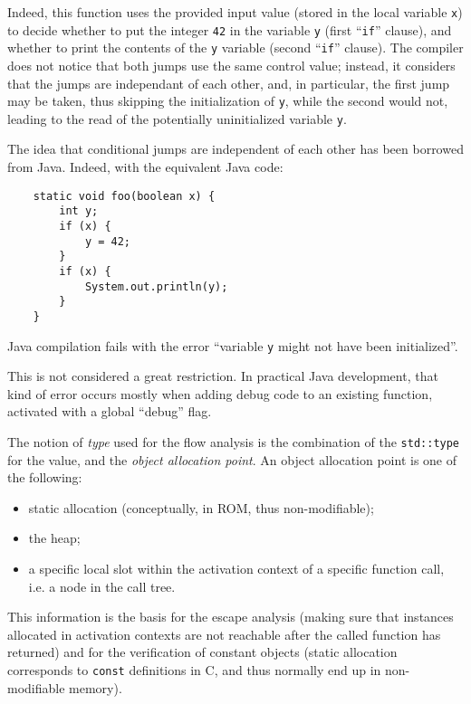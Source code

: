Indeed, this function uses the provided input value (stored in the local
variable \verb|x|) to decide whether to put the integer \verb|42| in the
variable \verb|y| (first ``\verb|if|'' clause), and whether to print the
contents of the \verb|y| variable (second ``\verb|if|'' clause). The
compiler does not notice that both jumps use the same control value;
instead, it considers that the jumps are independant of each other, and,
in particular, the first jump may be taken, thus skipping the
initialization of \verb|y|, while the second would not, leading to the
read of the potentially uninitialized variable \verb|y|.

\begin{rationale}
The idea that conditional jumps are independent of each other has been
borrowed from Java. Indeed, with the equivalent Java code:
\begin{verbatim}
    static void foo(boolean x) {
        int y;
        if (x) {
            y = 42;
        }
        if (x) {
            System.out.println(y);
        }
    }
\end{verbatim}
Java compilation fails with the error ``variable \verb|y| might not
have been initialized''.

This is not considered a great restriction. In practical Java
development, that kind of error occurs mostly when adding debug code to
an existing function, activated with a global ``debug'' flag.
\end{rationale}

The notion of \emph{type} used for the flow analysis is the combination
of the \verb|std::type| for the value, and the \emph{object allocation
point}. An object allocation point is one of the following:
\begin{itemize}

    \item static allocation (conceptually, in ROM, thus non-modifiable);

    \item the heap;

    \item a specific local slot within the activation context of a
    specific function call, i.e. a node in the call tree.

\end{itemize}
This information is the basis for the escape analysis (making sure that
instances allocated in activation contexts are not reachable after the
called function has returned) and for the verification of constant
objects (static allocation corresponds to \verb|const| definitions in C,
and thus normally end up in non-modifiable memory).


